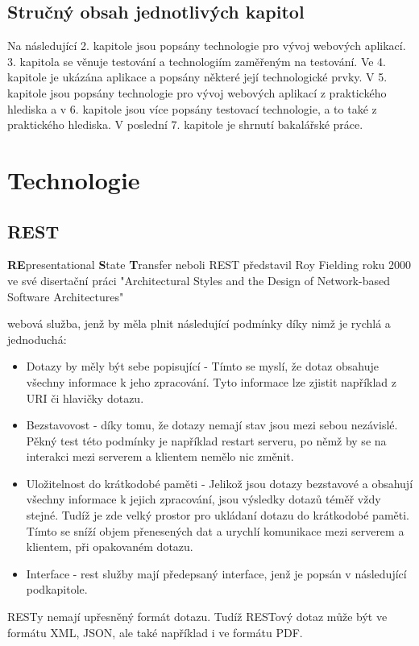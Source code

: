 \documentclass[czech,master,public,dept460,male,cpdeclaration,twoside]{diploma}
\begin{document}
\subsection{Stručný obsah jednotlivých kapitol}
Na následující 2. kapitole jsou popsány technologie pro vývoj webových aplikací. 3. kapitola se věnuje testování a technologiím zaměřeným na testování. Ve 4. kapitole je ukázána aplikace a popsány některé její technologické prvky. V 5. kapitole jsou popsány technologie pro vývoj webových aplikací z praktického hlediska a v 6. kapitole jsou více popsány testovací technologie, a to také z praktického hlediska. V poslední 7. kapitole je shrnutí bakalářské práce.

\section{Technologie}

\subsection{REST}
{\bf RE}presentational {\bf S}tate {\bf T}ransfer neboli REST představil Roy Fielding roku 2000 ve své disertační práci "Architectural Styles and the Design of Network-based Software Architectures"


webová služba, jenž by měla plnit následující podmínky díky nimž je rychlá a jednoduchá: 
\begin{itemize}
	\item Dotazy by měly být sebe popisující - Tímto se myslí, že dotaz obsahuje všechny informace k jeho zpracování. Tyto informace lze zjistit například z URI či hlavičky dotazu.
	\item Bezstavovost - díky tomu, že dotazy nemají stav jsou mezi sebou nezávislé. Pěkný test této podmínky je například restart serveru, po němž by se na interakci mezi serverem a klientem nemělo nic změnit.
	\item Uložitelnost do krátkodobé paměti - Jelikož jsou dotazy bezstavové a obsahují všechny informace k jejich zpracování, jsou výsledky dotazů téměř vždy stejné. Tudíž je zde velký prostor pro ukládaní dotazu do krátkodobé paměti. Tímto se sníží objem přenesených dat a urychlí komunikace mezi serverem a klientem, při opakovaném dotazu. 
	\item Interface - rest služby mají předepsaný interface, jenž je popsán v následující podkapitole.
\end{itemize}
RESTy nemají upřesněný formát dotazu. Tudíž RESTový dotaz může být ve formátu XML, JSON, ale také například i ve formátu PDF. \cite{RESTWebServicesOracle} \cite{RESTWebServicesOracle2}
\end{document}
